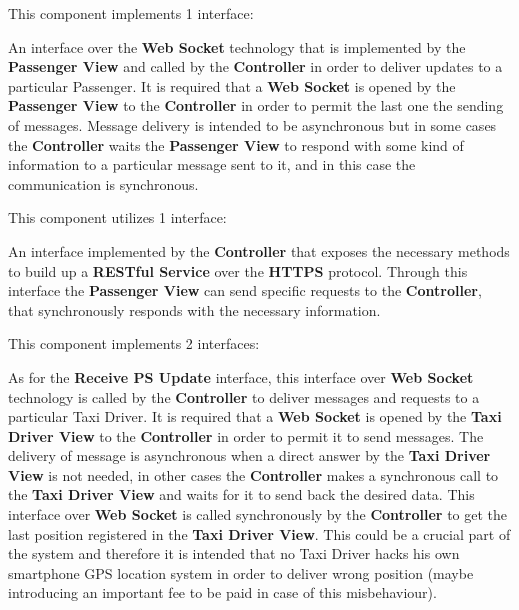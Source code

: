 \begin{itemize}
	This component implements 1 interface:
	\begin{itemize}
		 An interface over the \textbf{Web Socket} technology that is implemented by the \textbf{Passenger View} and called by the \textbf{Controller} in order to deliver updates to a particular Passenger.
		It is required that a \textbf{Web Socket} is opened by the \textbf{Passenger View} to the \textbf{Controller} in order to permit the last one the sending of messages.
		Message delivery is intended to be asynchronous but in some cases the \textbf{Controller} waits the \textbf{Passenger View} to respond with some kind of information to a particular message sent to it, and in this case the communication is synchronous.
	\end{itemize}
	This component utilizes 1 interface:
	\begin{itemize}
		 An interface implemented by the \textbf{Controller} that exposes the necessary methods to build up a \textbf{RESTful Service} over the \textbf{HTTPS} protocol.
		Through this interface the \textbf{Passenger View} can send specific requests to the \textbf{Controller}, that synchronously responds with the necessary information.
	\end{itemize}
	\itemBold{Taxi Driver View}
	This component implements 2 interfaces:
	\begin{itemize}
		 As for the \textbf{Receive PS Update} interface, this interface over \textbf{Web Socket} technology is called by the \textbf{Controller} to deliver messages and requests to a particular Taxi Driver.
		It is required that a \textbf{Web Socket} is opened by the \textbf{Taxi Driver View} to the \textbf{Controller} in order to permit it to send messages.
		The delivery of message is asynchronous when a direct answer by the \textbf{Taxi Driver View} is not needed, in other cases the \textbf{Controller} makes a synchronous call to the \textbf{Taxi Driver View} and waits for it to send back the desired data.
		 This interface over \textbf{Web Socket} is called synchronously by the \textbf{Controller} to get the last position registered in the \textbf{Taxi Driver View}.
		This could be a crucial part of the system and therefore it is intended that no Taxi Driver hacks his own smartphone GPS location system in order to deliver wrong position (maybe introducing an important fee to be paid in case of this misbehaviour).

\end{itemize}
\end{itemize}

